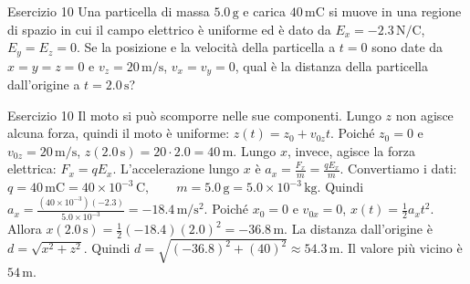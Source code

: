 \documentclass[a4paper]{article}
\begin{document}
\begin{snippetexercise}{Esercizio 10}
    Una particella di massa \(5.0\,\mathrm{g}\) e carica
    \(40\,\mathrm{mC}\) si muove in una regione di spazio in cui il campo
    elettrico è uniforme ed è dato da
    \(E_x = -2.3\,\mathrm{N/C}\), \(E_y = E_z = 0\).
    Se la posizione e la velocità della particella a \(t = 0\) sono date da
    \(x = y = z = 0\) e \(v_z = 20\,\mathrm{m/s}\),
    \(v_x = v_y = 0\), qual è la distanza della particella dall'origine a
    \(t = 2.0\,\mathrm{s}\)?

\end{snippetexercise}
\begin{snippetsolution}{Esercizio 10}
    Il moto si può scomporre nelle sue componenti.
    Lungo \(z\) non agisce alcuna forza, quindi il moto è uniforme:
    \(z(t) = z_0 + v_{0z}t.\)
    Poiché \(z_0 = 0\) e \(v_{0z} = 20\,\mathrm{m/s}\),
    \(z(2.0\,\mathrm{s}) = 20 \cdot 2.0 = 40\,\mathrm{m}.\)
    Lungo \(x\), invece, agisce la forza elettrica:
    \(F_x = qE_x.\)
    L'accelerazione lungo \(x\) è
    \(a_x = \frac{F_x}{m} = \frac{qE_x}{m}.\)
    Convertiamo i dati:
    \(q = 40\,\mathrm{mC} = 40 \times 10^{-3}\,\mathrm{C}, \qquad m = 5.0\,\mathrm{g} = 5.0 \times 10^{-3}\,\mathrm{kg}.\)
    Quindi
    \(a_x = \frac{ \left(40 \times 10^{-3}\right)(-2.3) }{ 5.0 \times 10^{-3} } = -18.4\,\mathrm{m/s^2}.\)
    Poiché \(x_0 = 0\) e \(v_{0x} = 0\),
    \(x(t) = \frac{1}{2}a_xt^2.\)
    Allora
    \(x(2.0\,\mathrm{s}) = \frac{1}{2}(-18.4)(2.0)^2 = -36.8\,\mathrm{m}.\)
    La distanza dall'origine è
    \(d = \sqrt{x^2 + z^2}.\)
    Quindi
    \(d = \sqrt{(-36.8)^2 + (40)^2} \approx 54.3\,\mathrm{m}.\)
    Il valore più vicino è
    \(\boxed{54\,\mathrm{m}}.\)
\end{snippetsolution}
\pagebreak
\end{document}
